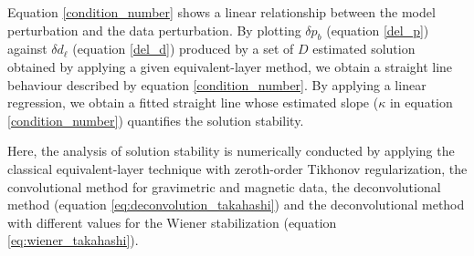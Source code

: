 Equation \ref{condition_number} shows a linear relationship between the model perturbation and 
the data perturbation.
By plotting $\delta p_b$ (equation \ref{del_p}) against $\delta d_\ell$ (equation \ref{del_d}) 
produced by a set of $D$ estimated solution obtained by applying a given equivalent-layer method, 
we obtain a straight line behaviour described by equation \ref{condition_number}.
By applying a linear regression, we obtain a fitted straight line whose estimated slope 
($\kappa$ in equation \ref{condition_number}) quantifies the solution stability.

Here, the  analysis of solution stability is numerically conducted by applying
the classical equivalent-layer technique with zeroth-order Tikhonov regularization,
the convolutional method for gravimetric and magnetic data,
the deconvolutional method (equation \ref{eq:deconvolution_takahashi}) and 
the deconvolutional method with different values for the Wiener stabilization 
(equation \ref{eq:wiener_takahashi}).
